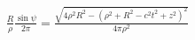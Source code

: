 %
%

\begin{equation*} \begin{aligned}
\frac{R}{\rho} \frac{\sin \psi}{2 \pi} = 
\frac{\sqrt{4 \rho^2 R^2 - (\rho^2 + R^2 - c^2t^2 + z^2)^2}}{4 \pi \rho^2}
\end{aligned} \end{equation*}

